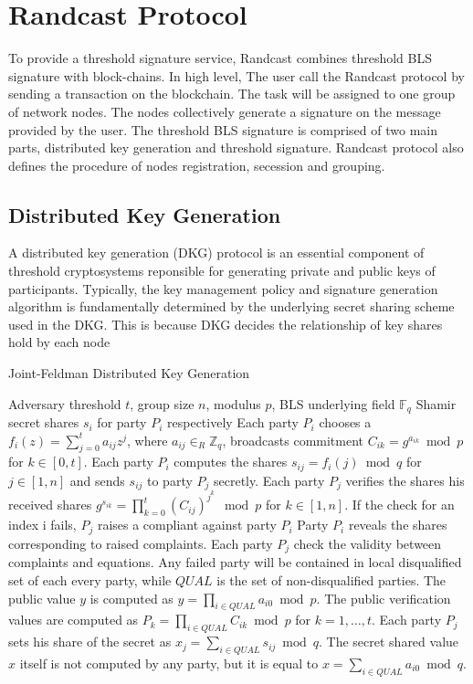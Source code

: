 \documentclass[11pt]{article}
\begin{document}
\section{Randcast Protocol}

To provide a threshold signature service, Randcast combines threshold BLS signature with block-chains. In high level, The user call the Randcast protocol by sending a transaction on the blockchain. The task will be assigned to one group of network nodes. The nodes collectively generate a signature on the message provided by the user. The threshold BLS signature is comprised of two main parts, distributed key generation and threshold signature. Randcast protocol also defines the procedure of nodes registration, secession and grouping.

\subsection{Distributed Key Generation}

A distributed key generation (DKG) protocol is an essential component of threshold cryptosystems reponsible for generating private and public keys of participants. Typically, the key management policy and signature generation algorithm is fundamentally determined by the underlying secret sharing scheme used in the DKG. This is because DKG decides the relationship of key shares hold by each node

\begin{algorithm}
\caption{Joint-Feldman Distributed Key Generation\cite{gennaro2007secure}}
\begin{algorithmic}[1]
\Require Adversary threshold $t$, group size $n$, modulus $p$, BLS underlying field $\mathbb{F}_q$
\Ensure Shamir secret shares $s_i$ for party $P_i$ respectively
\State Each party $P_i$ chooses a $f_i(z) = \sum_{j=0}^t a_{ij}z^{j}$, where $a_{ij} \in_R \mathbb{Z}_q$, broadcasts commitment $C_{ik} = g^{a_{ik}} \bmod p$ for $k \in [0,t]$. Each party $P_i$ computes the shares $s_{ij} = f_i(j) \bmod q$ for $j \in [1,n]$ and sends $s_{ij}$ to party $P_j$ secretly.
\State Each party $P_j$ verifies the shares his received shares $g^{s_{ik}} = \prod_{k=0}^t(C_{ij})^{j^k} \mod p$ for $k \in [1,n]$. If the check for an index i fails, $P_j$ raises a compliant against party $P_i$
\State Party $P_i$ reveals the shares corresponding to raised complaints. Each party $P_j$ check the validity between complaints and equations. Any failed party will be contained in local disqualified set of each every party, while $QUAL$ is the set of non-disqualified parties.
\State The public value $y$ is computed as $y = \prod_{i\in QUAL} a_{i0} \bmod p$. The public verification values are computed as $P_k = \prod_{i\in QUAL} C_{ik} \bmod p$ for $k = 1,\dots, t$. Each party $P_j$ sets his share of the secret as $x_j = \sum_{i\in QUAL} s_{ij} \bmod q$. The secret shared value $x$ itself is not computed by any party, but it is equal to $x = \sum_{i \in QUAL} a_{i0} \bmod q$.
\end{algorithmic}
\end{algorithm}
\end{document}
